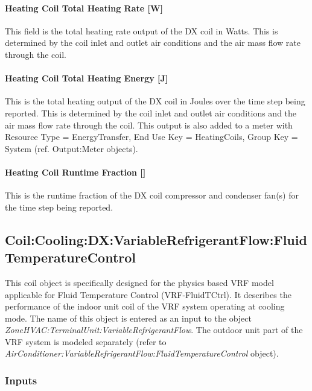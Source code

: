 \paragraph{Heating Coil Total Heating Rate {[}W{]}}\label{heating-coil-total-heating-rate-w}

This field is the total heating rate output of the DX coil in Watts. This is determined by the coil inlet and outlet air conditions and the air mass flow rate through the coil.

\paragraph{Heating Coil Total Heating Energy {[}J{]}}\label{heating-coil-total-heating-energy-j}

This is the total heating output of the DX coil in Joules over the time step being reported. This is determined by the coil inlet and outlet air conditions and the air mass flow rate through the coil. This output is also added to a meter with Resource Type = EnergyTransfer, End Use Key = HeatingCoils, Group Key = System (ref. Output:Meter objects).

\paragraph{\texorpdfstring{Heating Coil Runtime Fraction {[]}}{Heating Coil Runtime Fraction }}\label{heating-coil-runtime-fraction-1}

This is the runtime fraction of the DX coil compressor and condenser fan(s) for the time step being reported.

\subsection{Coil:Cooling:DX:VariableRefrigerantFlow:FluidTemperatureControl}\label{coilcoolingdxvariablerefrigerantflowfluidtemperaturecontrol}

This coil object is specifically designed for the physics based VRF model applicable for Fluid Temperature Control (VRF-FluidTCtrl). It describes the performance of the indoor unit coil of the VRF system operating at cooling mode. The name of this object is entered as an input to the object \emph{ZoneHVAC:TerminalUnit:VariableRefrigerantFlow}. The outdoor unit part of the VRF system is modeled separately (refer to \emph{AirConditioner:VariableRefrigerantFlow:FluidTemperatureControl} object).

\subsubsection{Inputs}\label{inputs-8-008}

